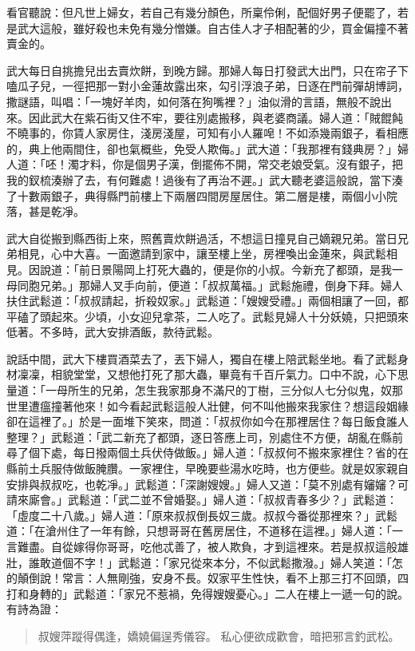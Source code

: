看官聽說：但凡世上婦女，若自己有幾分顏色，所稟伶俐，配個好男子便罷了，若是武大這般，雖好殺也未免有幾分憎嫌。自古佳人才子相配著的少，買金偏撞不著賣金的。

武大每日自挑擔兒出去賣炊餅，到晚方歸。那婦人每日打發武大出門，只在帘子下嗑瓜子兒，一徑把那一對小金蓮故露出來，勾引浮浪子弟，日逐在門前彈胡博詞，撒謎語，叫唱：「一塊好羊肉，如何落在狗嘴裡？」油似滑的言語，無般不說出來。因此武大在紫石街又住不牢，要往別處搬移，與老婆商議。婦人道：「賊餛飩不曉事的，你賃人家房住，淺房淺屋，可知有小人羅唣！不如添幾兩銀子，看相應的，典上他兩間住，卻也氣概些，免受人欺侮。」武大道：「我那裡有錢典房？」婦人道：「呸！濁才料，你是個男子漢，倒擺佈不開，常交老娘受氣。沒有銀子，把我的釵梳湊辦了去，有何難處！過後有了再治不遲。」武大聽老婆這般說，當下湊了十數兩銀子，典得縣門前樓上下兩層四間房屋居住。第二層是樓，兩個小小院落，甚是乾凈。

武大自從搬到縣西街上來，照舊賣炊餅過活，不想這日撞見自己嫡親兄弟。當日兄弟相見，心中大喜。一面邀請到家中，讓至樓上坐，房裡喚出金蓮來，與武鬆相見。因說道：「前日景陽岡上打死大蟲的，便是你的小叔。今新充了都頭，是我一母同胞兄弟。」那婦人叉手向前，便道：「叔叔萬福。」武鬆施禮，倒身下拜。婦人扶住武鬆道：「叔叔請起，折殺奴家。」武鬆道：「嫂嫂受禮。」兩個相讓了一回，都平磕了頭起來。少頃，小女迎兒拿茶，二人吃了。武鬆見婦人十分妖嬈，只把頭來低著。不多時，武大安排酒飯，款待武鬆。

說話中間，武大下樓買酒菜去了，丟下婦人，獨自在樓上陪武鬆坐地。看了武鬆身材凜凜，相貌堂堂，又想他打死了那大蟲，畢竟有千百斤氣力。口中不說，心下思量道：「一母所生的兄弟，怎生我家那身不滿尺的丁樹，三分似人七分似鬼，奴那世里遭瘟撞著他來！如今看起武鬆這般人壯健，何不叫他搬來我家住？想這段姻緣卻在這裡了。」於是一面堆下笑來，問道：「叔叔你如今在那裡居住？每日飯食誰人整理？」武鬆道：「武二新充了都頭，逐日答應上司，別處住不方便，胡亂在縣前尋了個下處，每日撥兩個土兵伏侍做飯。」婦人道：「叔叔何不搬來家裡住？省的在縣前土兵服侍做飯腌臢。一家裡住，早晚要些湯水吃時，也方便些。就是奴家親自安排與叔叔吃，也乾凈。」武鬆道：「深謝嫂嫂。」婦人又道：「莫不別處有嬸嬸？可請來廝會。」武鬆道：「武二並不曾婚娶。」婦人道：「叔叔青春多少？」武鬆道：「虛度二十八歲。」婦人道：「原來叔叔倒長奴三歲。叔叔今番從那裡來？」武鬆道：「在滄州住了一年有餘，只想哥哥在舊房居住，不道移在這裡。」婦人道：「一言難盡。自從嫁得你哥哥，吃他忒善了，被人欺負，才到這裡來。若是叔叔這般雄壯，誰敢道個不字！」武鬆道：「家兄從來本分，不似武鬆撒潑。」婦人笑道：「怎的顛倒說！常言：人無剛強，安身不長。奴家平生性快，看不上那三打不回頭，四打和身轉的」武鬆道：「家兄不惹禍，免得嫂嫂憂心。」二人在樓上一遞一句的說。有詩為證：
\begin{quote}
叔嫂萍蹤得偶逢，嬌嬈偏逞秀儀容。
私心便欲成歡會，暗把邪言釣武松。
\end{quote}

